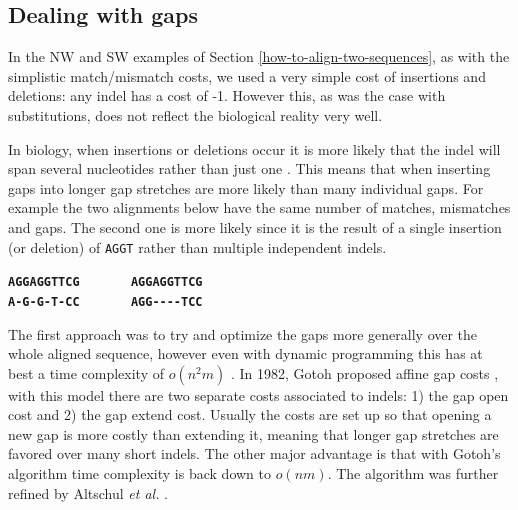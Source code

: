 \documentclass[
  11pt,
  twoside,
  BCOR=10mm,
  listof=totoc]{scrbook}
\begin{document}
\hypertarget{dealing-with-gaps}{%
\subsection{Dealing with gaps}\label{dealing-with-gaps}}

In the NW and SW examples of Section \ref{how-to-align-two-sequences}, as with the simplistic match/mismatch costs, we used a very simple cost of insertions and deletions: any indel has a cost of -1. However this, as was the case with substitutions, does not reflect the biological reality very well.

In biology, when insertions or deletions occur it is more likely that the indel will span several nucleotides rather than just one \autocite{cartwrightProblemsSolutionsEstimating2009}. This means that when inserting gaps into longer gap stretches are more likely than many individual gaps. For example the two alignments below have the same number of matches, mismatches and gaps. The second one is more likely since it is the result of a single insertion (or deletion) of \texttt{AGGT} rather than multiple independent indels.

\textbf{\texttt{AGGAGGTTCG}} ~~~~~~ \textbf{\texttt{AGGAGGTTCG}}\\
\textbf{\texttt{A-G-G-T-CC}} ~~~~~~ \textbf{\texttt{AGG-\/-\/-\/-TCC}}

The first approach was to try and optimize the gaps more generally \autocite{fitchOptimalSequenceAlignments1983} over the whole aligned sequence, however even with dynamic programming this has at best a time complexity of \(o(n^2m)\) \autocite{watermanBiologicalSequenceMetrics1976}. In 1982, Gotoh proposed affine gap costs \autocite{gotohImprovedAlgorithmMatching1982}, with this model there are two separate costs associated to indels: 1) the gap open cost and 2) the gap extend cost. Usually the costs are set up so that opening a new gap is more costly than extending it, meaning that longer gap stretches are favored over many short indels. The other major advantage is that with Gotoh's algorithm time complexity is back down to \(o(nm)\). The algorithm was further refined by Altschul \emph{et al.} \autocite{altschulOptimalSequenceAlignment1986}.
\end{document}
